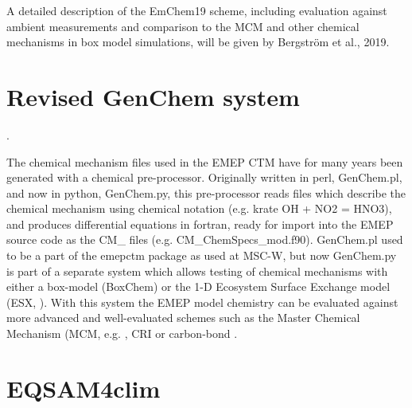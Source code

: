 A detailed description of the EmChem19 scheme, including evaluation
against ambient measurements and comparison to the MCM and other
chemical mechanisms in box model simulations, will be given by
Bergstr{\"o}m et al., 2019.

\nocite{BergstromEmChem2019}



\section{Revised GenChem system}
\label{sec:GChem}.

The chemical mechanism files used in the EMEP CTM have for many years
been generated with a chemical pre-processor. Originally written in
perl, GenChem.pl, and now in python, GenChem.py, this pre-processor reads
files which describe the chemical mechanism using chemical notation (e.g.
krate   OH + NO2 = HNO3), and produces differential equations in fortran,
ready for import into the EMEP source code as the CM\_ files (e.g.
CM\_ChemSpecs\_mod.f90). GenChem.pl used
to be a part of the emepctm package as used at MSC-W, but now GenChem.py
is part of a separate system which allows testing of chemical mechanisms
with either a box-model (BoxChem) or the 1-D Ecosystem Surface
Exchange model (ESX, \citealt{R2014:ESX}). With this system the
EMEP model chemistry can be evaluated against more advanced and
well-evaluated schemes such as the Master Chemical Mechanism (MCM, e.g.
\citealt{Jenkin2015,Saunders2003a}, CRI \citep{JenkinCRI2019} %
 or carbon-bond \citep[]{Yarwood_et_al:2005,LueckenAE2019}. 


\section{EQSAM4clim}
\label{sec:EQSAM}


